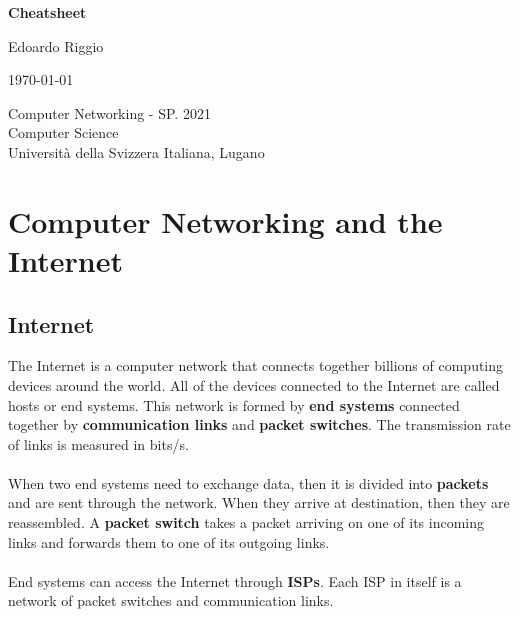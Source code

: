 \documentclass{article}
\begin{document}
\begin{titlepage}
    \begin{center}
        \vspace*{1cm}
        
        \Huge
        \textbf{Cheatsheet}
        
        \vspace{0.5cm}
        \LARGE
        
        \vspace{.5cm}
        
        Edoardo Riggio
   		  \vspace{1.5cm}
       
        \vfill
        
        \today
        
        \vspace{.8cm}
          \Large
          Computer Networking - SP. 2021 \\
        Computer Science\\
        Universit\`{a} della Svizzera Italiana, Lugano\\
        
    \end{center}
\end{titlepage}

\tableofcontents

\newpage

\section{Computer Networking and the Internet}
\subsection{Internet}
The Internet is a computer network that connects together billions of computing devices around the world. All of the devices connected to the Internet are called hosts or end systems. This network is formed by \textbf{end systems} connected together by \textbf{communication links} and \textbf{packet switches}. The transmission rate of links is measured in bits/s. \\ \\
When two end systems need to exchange data, then it is divided into \textbf{packets} and are sent through the network. When they arrive at destination, then they are reassembled. A \textbf{packet switch} takes a packet arriving on one of its incoming links and forwards them to one of its outgoing links.\\ \\
End systems can access the Internet through \textbf{ISPs}. Each ISP in itself is a network of packet switches and communication links.
\end{document}
